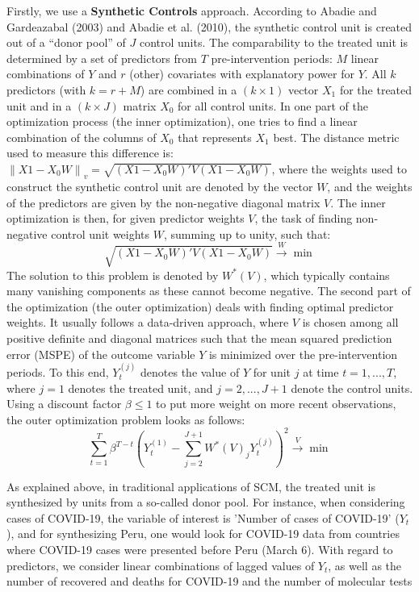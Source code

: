 \documentclass[12pt]{article}
\begin{document}
Firstly, we use a \textbf{Synthetic Controls} approach. According to Abadie and Gardeazabal (2003) and Abadie et al. (2010), the synthetic control unit is created out of a “donor pool” of $J$ control units. The comparability to the treated unit is determined by a set of predictors from $T$ pre-intervention periods: $M$ linear combinations of $Y$ and $r$ (other) covariates with explanatory power for $Y$. All $k$ predictors (with $k=r+M$) are combined in a $(k \times 1)$ vector $X_1$ for the treated unit and in a $(k \times J)$ matrix $X_0$ for all control units.
In one part of the optimization process (the inner optimization), one tries to find a linear combination of the columns of $X_0$ that represents $X_1$ best. The distance metric used to measure this difference is: $\left \| X1-X_0W \right \|_{v}=\sqrt{(X1-X_0W)'V\left ( X1-X_0W \right )}$, where the weights used to construct the synthetic control unit are denoted by the vector $W$, and the weights of the predictors are given by the non-negative diagonal matrix $V$. The inner optimization is then, for given predictor weights $V$, the task of finding non-negative control unit weights $W$, summing up to unity, such that:
\begin{equation}
\sqrt{(X1-X_0W)'V\left ( X1-X_0W \right )}\overset{W}{\longrightarrow} \min
\end{equation}
The solution to this problem is denoted by $W^*(V)$, which typically contains many vanishing components as these cannot become negative.
The second part of the optimization (the outer optimization) deals with finding optimal predictor weights. It usually follows a data-driven approach, where $V$ is chosen among all positive definite and diagonal matrices such that the mean squared prediction error (MSPE) of the outcome variable $Y$ is minimized over the pre-intervention periods. To this end, $Y_t^{(j)}$ denotes the value of $Y$ for unit $j$ at time $t=1,...,T$, where $j=1$ denotes the treated unit, and $j=2,...,J+1$ denote the control units.
Using a discount factor $\beta \leq 1$ to put more weight on more recent observations, the outer
optimization problem looks as follows:
\begin{equation}
\sum_{t=1}^{T}\beta ^{T-t}\left ( Y_t^{(1)}-\sum_{j=2}^{J+1} W^*(V)_{j}Y_t^{(j)}\right )^{2}\overset{V}{\longrightarrow} \min
\end{equation}

As explained above, in traditional applications of SCM, the treated unit is synthesized by units from a so-called donor pool. For instance, when considering cases of COVID-19, the variable of interest is 'Number of cases of COVID-19’ ($Y_t$), and for synthesizing Peru, one would look for COVID-19 data from countries where COVID-19 cases were presented before Peru (March 6). With regard to predictors, we consider linear combinations of lagged values of $Y_t$, as well as the number of recovered and deaths for COVID-19 and the number of molecular tests
\end{document}
